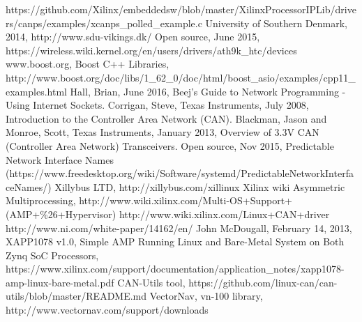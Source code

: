 \begin{thebibliography}{11} %
			https://github.com/Xilinx/embeddedsw/blob/master/XilinxProcessorIPLib/drivers/canps/examples/xcanps\_polled\_example.c
			University of Southern Denmark, 2014, http://www.sdu-vikings.dk/
			Open source, June 2015, https://wireless.wiki.kernel.org/en/users/drivers/ath9k\_htc/devices
			www.boost.org, Boost C++ Libraries, http://www.boost.org/doc/libs/1\_62\_0/doc/html/boost\_asio/examples/cpp11\_examples.html
			Hall, Brian, June 2016, Beej's Guide to Network Programming - Using Internet Sockets.
			Corrigan, Steve, Texas Instruments, July 2008, Introduction to the Controller Area Network (CAN).
			Blackman, Jason and Monroe, Scott, Texas Instruments, January 2013, Overview of 3.3V CAN (Controller Area Network) Transceivers.
			Open source, Nov 2015, Predictable Network Interface Names (https://www.freedesktop.org/wiki/Software/systemd/PredictableNetworkInterfaceNames/)
			Xillybus LTD, http://xillybus.com/xillinux
			Xilinx wiki Asymmetric Multiprocessing, http://www.wiki.xilinx.com/Multi-OS+Support+(AMP+\%26+Hypervisor)
			http://www.wiki.xilinx.com/Linux+CAN+driver
			http://www.ni.com/white-paper/14162/en/
			John McDougall, February 14, 2013, XAPP1078 v1.0, Simple AMP Running Linux and Bare-Metal System on Both Zynq SoC Processors, https://www.xilinx.com/support/documentation/application\_notes/xapp1078-amp-linux-bare-metal.pdf
			CAN-Utils tool, https://github.com/linux-can/can-utils/blob/master/README.md
			VectorNav, vn-100 library, http://www.vectornav.com/support/downloads
\end{thebibliography}
